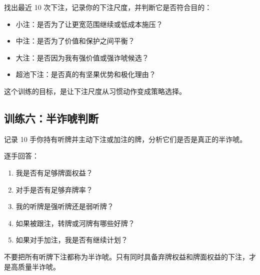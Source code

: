找出最近 10 次下注，记录你的下注尺度，并判断它是否符合目的：

\begin{itemize}
\item 小注：是否为了让更宽范围继续或低成本施压？
\item 中注：是否为了价值和保护之间平衡？
\item 大注：是否因为我有强价值或强诈唬候选？
\item 超池下注：是否真的有坚果优势和极化理由？
\end{itemize}

这个训练的目标，是让下注尺度从习惯动作变成策略选择。

\subsection*{训练六：半诈唬判断}

记录 10 手你持有听牌并主动下注或加注的牌，分析它们是否是真正的半诈唬。

逐手回答：

\begin{enumerate}
\item 我是否有足够牌面权益？
\item 对手是否有足够弃牌率？
\item 我的听牌是强听牌还是弱听牌？
\item 如果被跟注，转牌或河牌有哪些好牌？
\item 如果对手加注，我是否有继续计划？
\end{enumerate}

不要把所有听牌下注都称为半诈唬。只有同时具备弃牌权益和牌面权益的下注，才是高质量半诈唬。
